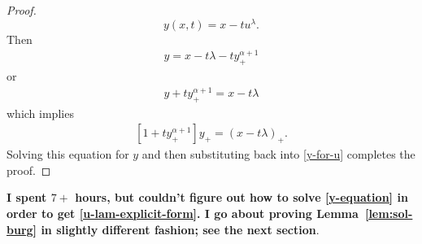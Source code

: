 \documentclass[12pt,reqno]{amsart}
\numberwithin{equation}{section}  %
\numberwithin{figure}{section}
\begin{document}
\begin{proof}
\begin{equation}
    y(x,t) = x - tu^{\lambda}. 
\end{equation}
%
%
%
%
Then
%
%
\begin{equation*}
\begin{split}
y = x - t \lambda - t y_{+}^{\alpha + 1}
\end{split}
\end{equation*}
%
%
or
%
\begin{equation*}
\begin{split}
y + ty_{+}^{\alpha + 1} = x - t \lambda
\end{split}
\end{equation*}
%
%
which implies
%
%
\begin{equation}
    \label{y-equation}
\begin{split}
[1 + ty_{+}^{\alpha + 1}]y_{+} = (x - t \lambda)_{+}.
\end{split}
\end{equation}
%
%
Solving this equation for $y$ and then substituting back into \eqref{y-for-u} completes the proof.
\end{proof}
\begin{framed}
    \textbf{I spent $7+$ hours, but couldn't figure out how to solve
\eqref{y-equation} in order to get \eqref{u-lam-explicit-form}. I go about
proving Lemma~\ref{lem:sol-burg} in slightly different fashion; see the next
section}.
\end{framed}
%
%
\end{document}
